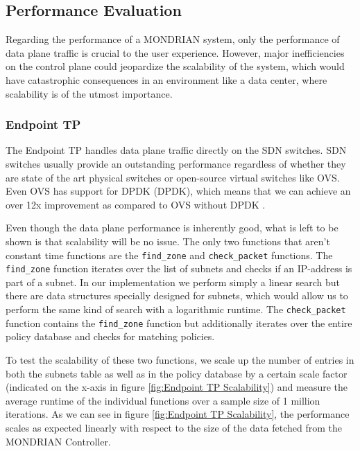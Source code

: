 \subsection{Performance Evaluation}\label{Performance Evaluation}
Regarding the performance of a MONDRIAN system, only the performance of data plane traffic is crucial to the user experience. However, major inefficiencies on the control plane could jeopardize the scalability of the system, which would have catastrophic consequences in an environment like a data center, where scalability is of the utmost importance.  

\subsubsection{Endpoint TP}
The Endpoint \acs{TP} handles data plane traffic directly on the \acs{SDN} switches. \acs{SDN} switches usually provide an outstanding performance regardless of whether they are state of the art physical switches or open-source virtual switches like \acs{OVS}. Even \acs{OVS} has support for \acs{DPDK} (\acl{DPDK}), which means that we can achieve an over 12x improvement as compared to \acs{OVS} without \acs{DPDK} \cite{intel2015OVS}.

Even though the data plane performance is inherently good, what is left to be shown is that scalability will be no issue. The only two functions that aren't constant time functions are the \texttt{find_zone} and \texttt{check_packet} functions. The \texttt{find_zone} function iterates over the list of subnets and checks if an \acs{IP}-address is part of a subnet. In our implementation we perform simply a linear search but there are data structures specially designed for subnets, which would allow us to perform the same kind of search with a logarithmic runtime. The \texttt{check_packet} function contains the \texttt{find_zone} function but additionally iterates over the entire policy database and checks for matching policies. 

To test the scalability of these two functions, we scale up the number of entries in both the subnets table as well as in the policy database by a certain scale factor (indicated on the x-axis in figure \ref{fig:Endpoint TP Scalability}) and measure the average runtime of the individual functions over a sample size of 1 million iterations. As we can see in figure \ref{fig:Endpoint TP Scalability}, the performance scales as expected linearly with respect to the size of the data fetched from the MONDRIAN Controller.


